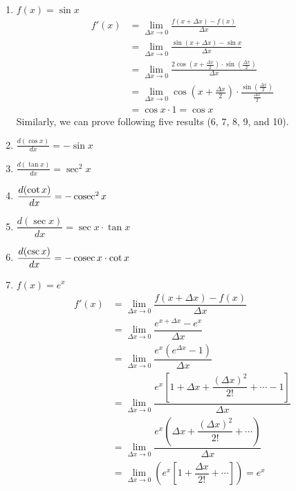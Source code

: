 \begin{enumerate}
    \item $f(x) = \sin x$
        \begin{align*}
            f'(x) &= \lim_{\Delta x \to 0} \frac{f(x + \Delta x) - f(x)}{\Delta x} \\
            &= \lim_{\Delta x \to 0} \frac{\sin(x + \Delta x) - \sin x}{\Delta x} \\
            &= \lim_{\Delta x \to 0} \frac{2 \cos \left(x + \frac{\Delta x}{2}\right) \cdot \sin \left( \frac{\Delta x}{2}\right)}{\Delta x} \\
            &= \lim_{\Delta x \to 0} \cos \left(x + \frac{\Delta x}{2}\right) \cdot \frac{\sin \left( \frac{\Delta x}{2}\right)}{\frac{\Delta x}{2}} \\
            &= \cos x \cdot 1 = \cos x
        \end{align*}
            Similarly, we can prove following five results (6, 7, 8, 9, and 10).
    
    \item $\frac{d(\cos x)}{dx} = -\sin x $
    \item $\frac{d(\tan x)}{dx} = \sec^2 x$
    \item $\dfrac{d (\cot x)}{dx} = -\operatorname{cosec}^2 x$

    \item $\dfrac{d (\sec x)}{dx} = \sec x \cdot \tan x$
        
    \item $\dfrac{d (\csc x)}{dx} = -\operatorname{cosec} x \cdot \cot x$
        
    \item $f(x) = e^x$
        \begin{align*}
            f'(x) &= \lim_{\Delta x \to 0} \dfrac{f(x+\Delta x) - f(x)}{\Delta x} \\
            &= \lim_{\Delta x \to 0} \dfrac{e^{x+\Delta x} - e^x}{\Delta x} \\
            &= \lim_{\Delta x \to 0} \dfrac{e^x \left(e^{\Delta x} - 1\right)}{\Delta x} \\
            &= \lim_{\Delta x \to 0} \dfrac{e^x \left[1 + \Delta x + \dfrac{(\Delta x)^2}{2!} + \dotsb - 1\right]}{\Delta x} \\
            &= \lim_{\Delta x \to 0} \dfrac{e^x \left(\Delta x + \dfrac{(\Delta x)^2}{2!} + \cdots \right)}{\Delta x} \\
            &= \lim_{\Delta x \to 0} \left( e^x \left[1 + \dfrac{\Delta x}{2!} + \dotsb \right] \right) = e^x
        \end{align*}
        

\end{enumerate}
